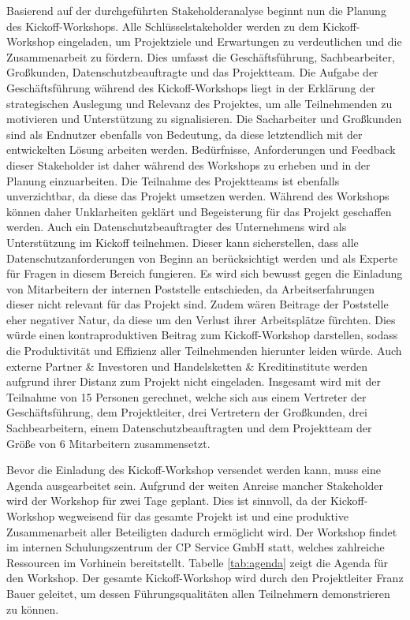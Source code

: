Basierend auf der durchgeführten Stakeholderanalyse beginnt nun die Planung des Kickoff-Workshops. Alle Schlüsselstakeholder werden zu dem Kickoff-Workshop eingeladen, um Projektziele und Erwartungen zu verdeutlichen und die Zusammenarbeit zu fördern. Dies umfasst die Geschäftsführung, Sachbearbeiter, Großkunden, Datenschutzbeauftragte und das Projektteam. Die Aufgabe der Geschäftsführung während des Kickoff-Workshops liegt in der Erklärung der strategischen Auslegung und Relevanz des Projektes, um alle Teilnehmenden zu motivieren und Unterstützung zu signalisieren. Die Sacharbeiter und Großkunden sind als Endnutzer ebenfalls von Bedeutung, da diese letztendlich mit der entwickelten Lösung arbeiten werden. Bedürfnisse, Anforderungen und Feedback dieser Stakeholder ist daher während des Workshops zu erheben und in der Planung einzuarbeiten. Die Teilnahme des Projektteams ist ebenfalls unverzichtbar, da diese das Projekt umsetzen werden. Während des Workshops können daher Unklarheiten geklärt und Begeisterung für das Projekt geschaffen werden. Auch ein Datenschutzbeauftragter des Unternehmens wird als Unterstützung im Kickoff teilnehmen. Dieser kann sicherstellen, dass alle Datenschutzanforderungen von Beginn an berücksichtigt werden und als Experte für Fragen in diesem Bereich fungieren. Es wird sich bewusst gegen die Einladung von Mitarbeitern der internen Poststelle entschieden, da Arbeitserfahrungen dieser nicht relevant für das Projekt sind. Zudem wären Beitrage der Poststelle eher negativer Natur, da diese um den Verlust ihrer Arbeitsplätze fürchten. Dies würde einen kontraproduktiven Beitrag zum Kickoff-Workshop darstellen, sodass die Produktivität und Effizienz aller Teilnehmenden hierunter leiden würde. Auch externe Partner \& Investoren und Handelsketten \& Kreditinstitute werden aufgrund ihrer Distanz zum Projekt nicht eingeladen. Insgesamt wird mit der Teilnahme von 15 Personen gerechnet, welche sich aus einem Vertreter der Geschäftsführung, dem Projektleiter, drei Vertretern der Großkunden, drei Sachbearbeitern, einem Datenschutzbeauftragten und dem Projektteam der Größe von 6 Mitarbeitern zusammensetzt.
\vspace{10pt}

Bevor die Einladung des Kickoff-Workshop versendet werden kann, muss eine Agenda ausgearbeitet sein. Aufgrund der weiten Anreise mancher Stakeholder wird der Workshop für zwei Tage geplant. Dies ist sinnvoll, da der Kickoff-Workshop wegweisend für das gesamte Projekt ist und eine produktive Zusammenarbeit aller Beteiligten dadurch ermöglicht wird. Der Workshop findet im internen Schulungszentrum der CP Service GmbH statt, welches zahlreiche Ressourcen im Vorhinein bereitstellt. Tabelle \ref{tab:agenda} zeigt die Agenda für den Workshop. Der gesamte Kickoff-Workshop wird durch den Projektleiter Franz Bauer geleitet, um dessen Führungsqualitäten allen Teilnehmern demonstrieren zu können.

